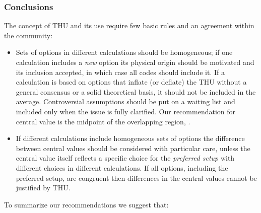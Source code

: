 \subsubsection{Conclusions}
The concept of THU and its use require few basic rules and an agreement within
the community:
\begin{itemize}

\item Sets of options in different calculations should be homogeneous; if one
calculation includes a {\em new} option its physical origin should be
motivated and its inclusion accepted, in which case all codes should include it.
If a calculation is based on options that inflate (or deflate) the THU without
a general consensus or a solid theoretical basis, it should not be included in 
the average. Controversial assumptions should be put on a waiting list and 
included only when the issue is fully clarified. Our recommendation for central 
value is the midpoint of the overlapping region, .

\item If different calculations include homogeneous sets of options the
difference between central values should be considered with particular care, 
unless the central value itself reflects a specific choice for the 
{\em preferred setup} with different choices in different calculations. If 
all options, including the preferred setup, are congruent then differences 
in the central values cannot be justified by THU.

\end{itemize}

To summarize our recommendations we suggest that:

